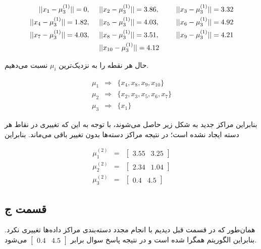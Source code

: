 \documentclass[12pt, a4paper]{article}
\begin{document}
\begin{eqnarray*}
    ||x_1 - \mu_3^{(1)}|| = 0, & \hspace{.5cm} ||x_2 - \mu_3^{(1)}|| = 3.86, & \hspace{.5cm} ||x_3 - \mu_3^{(1)}|| = 3.32 \\
    ||x_4 - \mu_3^{(1)}|| = 1.82, & \hspace{.5cm} ||x_5 - \mu_3^{(1)}|| = 4.03, & \hspace{.5cm} ||x_6 - \mu_3^{(1)}|| = 4.92 \\
    ||x_7 - \mu_3^{(1)}|| = 4.03, & \hspace{.5cm} ||x_8 - \mu_3^{(1)}|| = 3.51, & \hspace{.5cm} ||x_9 - \mu_3^{(1)}|| = 4.21 \\
    & \hspace{.5cm} ||x_{10} - \mu_3^{(1)}|| = 4.12 &
\end{eqnarray*}

حال هر نقطه را به نزدیک‌ترین $\mu_i$ نسبت می‌دهیم.

\begin{eqnarray*}
    \mu_1 & \Longrightarrow & \{x_4, x_8, x_9, x_{10} \} \\
    \mu_2 & \Longrightarrow & \{x_2, x_3, x_5, x_6, x_7 \} \\
    \mu_3 & \Longrightarrow & \{x_1 \}
\end{eqnarray*}

بنابراین مراکز جدید به شکل زیر حاصل می‌شوند، با توجه به این که تغییری در نقاط هر دسته ایجاد نشده است؛ در نتیجه
مراکز دسته‌ها بدون تغییر باقی می‌ماند. بنابراین

\begin{eqnarray*}
    \mu_1^{(2)} & = & \begin{bmatrix}3.55& 3.25\end{bmatrix} \\
    \mu_2^{(2)} & = & \begin{bmatrix}2.34 & 1.04\end{bmatrix} \\
    \mu_3^{(2)} & = & \begin{bmatrix}0.4& 4.5\end{bmatrix}
\end{eqnarray*}

\subsection*{قسمت ج}

همان‌طور که در قسمت قبل دیدیم با انجام مجدد دسته‌بندی مراکز داده‌ها تغییری نکرد. بنابراین الگوریتم همگرا شده است
و در نتیجه پاسخ سوال برابر $\begin{bmatrix}0.4& 4.5\end{bmatrix}$ می‌شود.
\end{document}
